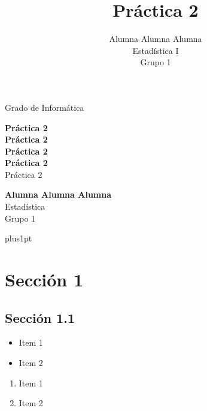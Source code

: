 \documentclass[12pt,a4paper,titlepage,twopages]{article}
\title{Práctica 2}
\author{Alumna Alumna Alumna\\ \vspace{5mm} Estadística I \\ Grupo 1}
\begin{document}
\thispagestyle{empty}

\begin{center}
\Large{Grado de Informática} \\
\bigskip

\begin{figure}[!h]
\begin{center}
\end{center}
\end{figure}

\vspace{40mm}

\textbf{\Large{Práctica 2}} \\
\bigskip
\bigskip
\textbf{\Huge{Práctica 2}} \\
\bigskip
\textbf{\Huge{Práctica 2}} \\
\bigskip
\LARGE{\textbf{Práctica 2}} \\
\Large{Práctica 2} \\

\vspace{\fill}

\textbf{\Large{Alumna Alumna Alumna}} \\
\bigskip
\Large{Estadística \\ Grupo 1}

\bigskip
\bigskip
\bigskip
\bigskip

\end{center}



 \renewcommand\baselinestretch{1.2}
\baselineskip=18pt plus1pt

\newpage
\tableofcontents

\thispagestyle{empty}
\newpage




\section{Sección 1}

\subsection{Sección 1.1}



\begin{itemize}
\item Item 1 
\item Item 2 
\end{itemize}




\begin{enumerate}
\item Item 1 
\item Item 2
\end{enumerate}
 
\end{document}
